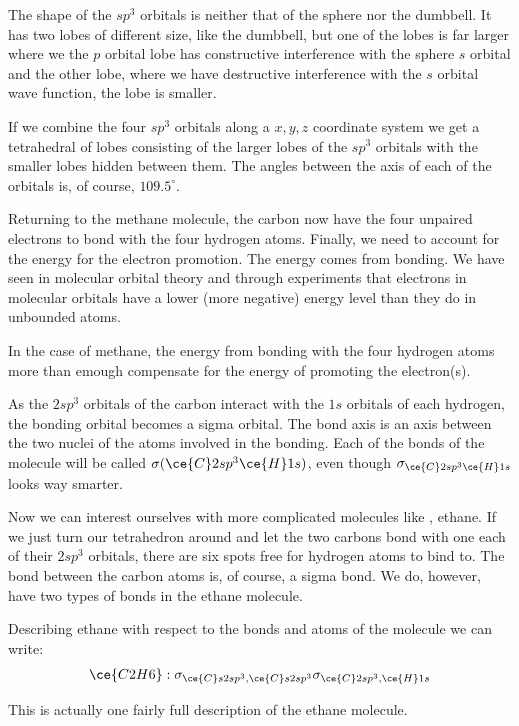 \documentclass[../mit-general-chemistry.tex]{subfiles}
\begin{document}
The shape of the $sp^3$ orbitals is neither that of the sphere nor the
dumbbell. It has two lobes of different size, like the dumbbell, but
one of the lobes is far larger where we the $p$ orbital lobe has
constructive interference with the sphere $s$ orbital and the other
lobe, where we have destructive interference with the $s$ orbital wave
function, the lobe is smaller.

If we combine the four $sp^3$ orbitals along a $x, y, z$ coordinate
system we get a tetrahedral of lobes consisting of the larger lobes of
the $sp^3$ orbitals with the smaller lobes hidden between them. The
angles between the axis of each of the orbitals is, of course,
$109.5^{\circ}$.


Returning to the methane molecule, the carbon now have the four
unpaired electrons to bond with the four hydrogen atoms. Finally, we
need to account for the energy for the electron promotion. The energy
comes from bonding. We have seen in molecular orbital theory and
through experiments that electrons in molecular orbitals have a lower
(more negative) energy level than they do in unbounded atoms.

In the case of methane, the energy from bonding with the four hydrogen
atoms more than emough compensate for the energy of promoting the
electron(s).

As the $2sp^3$ orbitals of the carbon interact with the $1s$ orbitals
of each hydrogen, the bonding orbital becomes a sigma orbital. The
bond axis is an axis between the two nuclei of the atoms involved in
the bonding. Each of the  bonds of the molecule will be
called $\sigma(\ce{C}2sp^3\ce{H}1s)$, even though
$\sigma_{\ce{C}2sp^3\ce{H}1s}$ looks way smarter.



Now we can interest ourselves with more complicated molecules like
, ethane. If we just turn our tetrahedron around and let the
two carbons bond with one each of their $2sp^3$ orbitals, there are
six spots free for hydrogen atoms to bind to. The bond between the
carbon atoms is, of course, a sigma bond. We do, however, have two
types of bonds in the ethane molecule.

Describing ethane with respect to the bonds and atoms of the molecule
we can write:
\begin{equation*}
  \ce{C2H6}:
  \sigma_{\ce{C}s2sp^3,\ce{C}s2sp^3}\sigma_{\ce{C}2sp^3,\ce{H}1s}
\end{equation*}

This is actually one fairly full description of the ethane molecule.
\end{document}
